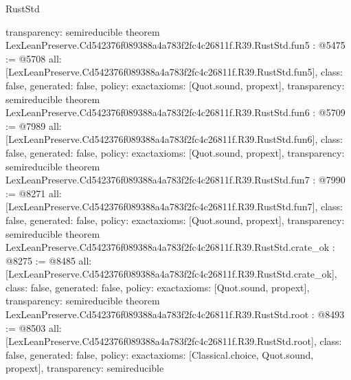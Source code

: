 \begin{lexlean}{RustStd}
\begin{coremodule}
{  transparency: semireducible
}
theorem LexLeanPreserve.Cd542376f089388a4a783f2fc4c26811f.R39.RustStd.fun5 : @5475 := @5708 {
  all: [LexLeanPreserve.Cd542376f089388a4a783f2fc4c26811f.R39.RustStd.fun5],
  class: false,
  generated: false,
  policy: exact{axioms: [Quot.sound, propext]},
  transparency: semireducible
}
theorem LexLeanPreserve.Cd542376f089388a4a783f2fc4c26811f.R39.RustStd.fun6 : @5709 := @7989 {
  all: [LexLeanPreserve.Cd542376f089388a4a783f2fc4c26811f.R39.RustStd.fun6],
  class: false,
  generated: false,
  policy: exact{axioms: [Quot.sound, propext]},
  transparency: semireducible
}
theorem LexLeanPreserve.Cd542376f089388a4a783f2fc4c26811f.R39.RustStd.fun7 : @7990 := @8271 {
  all: [LexLeanPreserve.Cd542376f089388a4a783f2fc4c26811f.R39.RustStd.fun7],
  class: false,
  generated: false,
  policy: exact{axioms: [Quot.sound, propext]},
  transparency: semireducible
}
theorem LexLeanPreserve.Cd542376f089388a4a783f2fc4c26811f.R39.RustStd.crate_ok : @8275 := @8485 {
  all: [LexLeanPreserve.Cd542376f089388a4a783f2fc4c26811f.R39.RustStd.crate_ok],
  class: false,
  generated: false,
  policy: exact{axioms: [Quot.sound, propext]},
  transparency: semireducible
}
theorem LexLeanPreserve.Cd542376f089388a4a783f2fc4c26811f.R39.RustStd.root : @8493 := @8503 {
  all: [LexLeanPreserve.Cd542376f089388a4a783f2fc4c26811f.R39.RustStd.root],
  class: false,
  generated: false,
  policy: exact{axioms: [Classical.choice, Quot.sound, propext]},
  transparency: semireducible
}


\end{coremodule}
\end{lexlean}
